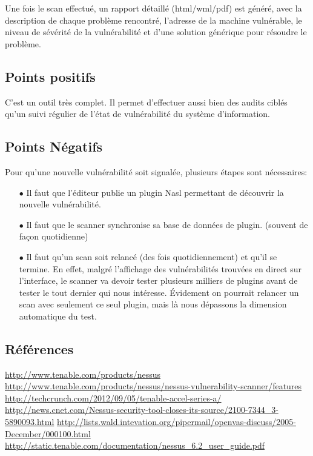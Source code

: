 Une fois le scan effectué, un rapport détaillé (html/wml/pdf) est généré, avec la description de chaque problème rencontré, l’adresse de la machine vulnérable, le niveau de sévérité de la vulnérabilité et d’une solution générique pour résoudre le problème.


\subsection{Points positifs}
C’est un outil très complet. Il permet d'effectuer aussi bien des audits ciblés qu’un suivi régulier de l’état de vulnérabilité du système d’information.

\subsection{Points Négatifs}
Pour qu’une nouvelle vulnérabilité soit signalée, plusieurs étapes sont nécessaires:\\
\begin{itemize}
\item [$\bullet$]Il faut que l’éditeur publie un plugin Nasl permettant de découvrir la nouvelle vulnérabilité.\\
\item [$\bullet$]Il faut que le scanner synchronise sa base de données de plugin. (souvent de façon quotidienne)\\
\item [$\bullet$]Il faut qu’un scan soit relancé (des fois quotidiennement) et qu’il se termine. En effet, malgré l’affichage des vulnérabilités trouvées en direct sur l’interface, le scanner va devoir tester plusieurs milliers de plugins avant de tester le tout dernier qui nous intéresse. Évidement on pourrait relancer un scan avec seulement ce seul plugin, mais là nous dépassons la dimension automatique du test.
\end{itemize}

\subsection{Références}
\small
\noindent
 [1] \url{http://www.tenable.com/products/nessus} \newline
 [2] \url{http://www.tenable.com/products/nessus/nessus-vulnerability-scanner/features} \newline
 [3] \url{http://techcrunch.com/2012/09/05/tenable-accel-series-a/} \newline
 [3] \url{http://news.cnet.com/Nessus-security-tool-closes-its-source/2100-7344_3-5890093.html} \newline
 [5] \url{http://lists.wald.intevation.org/pipermail/openvas-discuss/2005-December/000100.html} \newline
 [6] \url{http://static.tenable.com/documentation/nessus_6.2_user_guide.pdf} \newline
\normalsize